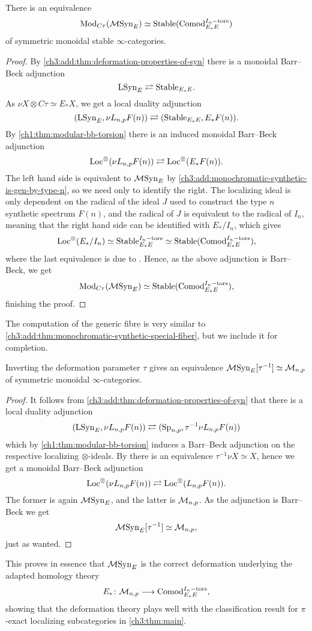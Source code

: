 \begin{theorem}
    \label{ch3:add:thm:monochromatic-synthetic-special-fiber}
    There is an equivalence
    \[\mathrm{Mod}_{C\tau}(\mathcal{M}\mathrm{Syn}_{E}) \simeq \mathrm{Stable}(\mathrm{Comod}_{E_*E}^{I_n-\mathrm{tors}})\]
    of symmetric monoidal stable $\infty$-categories. 
\end{theorem}
\begin{proof}
    By \cref{ch3:add:thm:deformation-properties-of-syn} there is a monoidal Barr--Beck adjunction 
    \[\mathrm{LSyn}_{E} \rightleftarrows \mathrm{Stable}_{E_*E}.\]
    As $\nu X \otimes C\tau \simeq E_{*} X$, we get a local duality adjunction 
    \[(\mathrm{LSyn}_{E}, \nu L_{n,p} F(n))\rightleftarrows (\mathrm{Stable}_{E_*E}, E_{*}F(n)).\]
    By \cref{ch1:thm:modular-bb-torsion} there is an induced monoidal Barr--Beck adjunction 
    \[\operatorname{Loc}^\otimes(\nu L_{n,p} F(n))\rightleftarrows \operatorname{Loc}^\otimes(E_{*}F(n)).\]
    The left hand side is equivalent to $\mathcal{M}\mathrm{Syn}_{E}$ by \cref{ch3:add:monochromatic-synthetic-is-gen-by-type-n}, so we need only to identify the right. The localizing ideal is only dependent on the radical of the ideal $J$ used to construct the type $n$ synthetic spectrum $F(n)$, and the radical of $J$ is equivalent to the radical of $I_n$, meaning that the right hand side can be identified with $E_{*}/I_n$, which gives 
    \[\operatorname{Loc}^\otimes(E_{*}/I_n) \simeq \mathrm{Stable}_{E_*E}^{I_n-\mathrm{tors}}\simeq \mathrm{Stable}(\mathrm{Comod}_{E_*E}^{I_n-\mathrm{tors}}),\]
    where the last equivalence is due to \cite[3.17]{barthel-heard-valenzuela_2020}. Hence, as the above adjunction is Barr--Beck, we get 
    \[\mathrm{Mod}_{C\tau}(\mathcal{M}\mathrm{Syn}_{E}) \simeq \mathrm{Stable}(\mathrm{Comod}_{E_*E}^{I_n-\mathrm{tors}}),\]
    finishing the proof. 
\end{proof}

The computation of the generic fibre is very similar to \cref{ch3:add:thm:monochromatic-synthetic-special-fiber}, but we include it for completion. 

\begin{theorem}
    Inverting the deformation parameter $\tau$ gives an equivalence $\mathcal{M}\mathrm{Syn}_{E}[\tau^{-1}] \simeq \mathcal{M}_{n,p}$ of symmetric monoidal $\infty$-categories. 
\end{theorem}
\begin{proof}
    It follows from \cref{ch3:add:thm:deformation-properties-of-syn} that there is a local duality adjunction 
    \[(\mathrm{LSyn}_{E}, \nu L_{n,p} F(n)) \rightleftarrows (\mathrm{Sp}_{n,p}, \tau^{-1}\nu L_{n,p} F(n))\]
    which by \cref{ch1:thm:modular-bb-torsion} induces a Barr--Beck adjunction on the respective localizing $\otimes$-ideals. By \cite[4.40]{pstragowski_2022} there is an equivalence $\tau^{-1}\nu X \simeq X$, hence we get a monoidal Barr--Beck adjunction 
    \[\operatorname{Loc}^\otimes(\nu L_{n,p} F(n))\rightleftarrows \operatorname{Loc}^\otimes(L_{n,p} F(n)).\]
    The former is again $\mathcal{M}\mathrm{Syn}_{E}$, and the latter is $\mathcal{M}_{n,p}$. As the adjunction is Barr--Beck we get 
    \[\mathcal{M}\mathrm{Syn}_{E}[\tau^{-1}]\simeq \mathcal{M}_{n,p},\]
    just as wanted. 
\end{proof}

This proves in essence that $\mathcal{M}\mathrm{Syn}_{E}$ is the correct deformation underlying the adapted homology theory 
\[E_*\colon \mathcal{M}_{n,p} \longrightarrow \mathrm{Comod}_{E_*E}^{I_n-\mathrm{tors}},\] 
showing that the deformation theory plays well with the classification result for $\pi$-exact localizing subcategories in \cref{ch3:thm:main}. 






